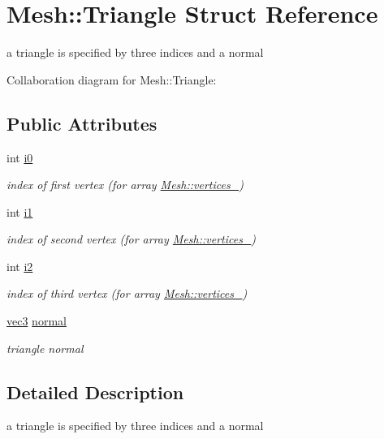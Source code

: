 \hypertarget{structMesh_1_1Triangle}{}\section{Mesh\+:\+:Triangle Struct Reference}
\label{structMesh_1_1Triangle}


a triangle is specified by three indices and a normal  




Collaboration diagram for Mesh\+:\+:Triangle\+:
\subsection*{Public Attributes}
\begin{DoxyCompactItemize}
\item 
int \hyperlink{structMesh_1_1Triangle_a6a61f7ea00034397eed1adcf0fae1790}{i0}
\begin{DoxyCompactList}\small\item\em index of first vertex (for array \hyperlink{classMesh_a986edf1ab1d37e517ff8adc928519528}{Mesh\+::vertices\+\_\+}) \end{DoxyCompactList}\item 
int \hyperlink{structMesh_1_1Triangle_afc583a0169089f8a73367a31cec7bc39}{i1}
\begin{DoxyCompactList}\small\item\em index of second vertex (for array \hyperlink{classMesh_a986edf1ab1d37e517ff8adc928519528}{Mesh\+::vertices\+\_\+}) \end{DoxyCompactList}\item 
int \hyperlink{structMesh_1_1Triangle_ae123132ba821ea91e4a9fb12349bd4ea}{i2}
\begin{DoxyCompactList}\small\item\em index of third vertex (for array \hyperlink{classMesh_a986edf1ab1d37e517ff8adc928519528}{Mesh\+::vertices\+\_\+}) \end{DoxyCompactList}\item 
\hyperlink{classvec3}{vec3} \hyperlink{structMesh_1_1Triangle_a697c3d7e2f4a316e7b486e048efff56d}{normal}
\begin{DoxyCompactList}\small\item\em triangle normal \end{DoxyCompactList}\end{DoxyCompactItemize}


\subsection{Detailed Description}
a triangle is specified by three indices and a normal 

